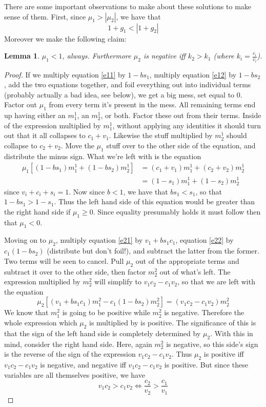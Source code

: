 \documentclass{article}
\theoremstyle{definition}
\theoremstyle{plain}
\theoremstyle{theorem}
\newtheorem{lemma}{Lemma}[section]
\begin{document}
There are some important observations to make about these solutions to make sense of them. First, since $\mu_1 > |\mu_2|$, we have that 
\[ 1+g_1 < |1+g_2| \]
Moreover we make the following claim:
\begin{lemma}
	$\mu_1 < 1$, always. Furthermore $\mu_2$ is negative iff $k_2 > k_1$ (where $k_i = \frac{c_i}{v_i}$). 
\end{lemma}
\begin{proof}
	If we multiply equation \ref{e11} by $1-bs_1$, multiply equation \ref{e12} by $1-bs_2$, add the two equations together, and foil everything out into individual terms (probably actually a bad idea, see below), we get a big mess, set equal to $0$. Factor out $\mu_1$ from every term it's present in the mess. All remaining terms end up having either an $m^1_1$, an $m^1_2$, or both. Factor these out from their terms. Inside of the expression multiplied by $m^1_1$, without applying any identities it should turn out that it all collapses to $c_1+v_1$. Likewise the stuff multiplied by $m^1_2$ should collapse to $c_2 + v_2$. Move the $\mu_1$ stuff over to the other side of the equation, and distribute the minus sign. What we're left with is the equation 
\begin{align}
	 \mu_1[(1-bs_1)m^1_1 + (1-bs_2)m^1_2] &= (c_1+v_1)m^1_1 + (c_2+v_2)m^1_2 \\
	 &= (1-s_1)m^1_1 + (1-s_2)m^1_2
\end{align}
since $v_i+c_i+s_i=1$. Now since $b<1$, we have that $bs_1 < s_1$, so that $1-bs_1 > 1-s_1$. Thus the left hand side of this equation would be greater than the right hand side if $\mu_1 \geq 0$. Since equality presumably holds it must follow then that $\mu_1 < 0$. \par 
Moving on to $\mu_2$, multiply equation \ref{e21} by $v_1 + bs_1c_1$, equation \ref{e22} by $c_1(1-bs_2)$ (distribute but don't foil!), and subtract the latter from the former. Two terms will be seen to cancel. Pull $\mu_2$ out of the appropriate terms and subtract it over to the other side, then factor $m^2_2$ out of what's left. The expression multiplied by $m^2_2$ will simplify to $v_1c_2 - c_1v_2$, so that we are left with the equation
\[ \mu_2[(v_1+bs_1c_1)m^2_1-c_1(1-bs_2)m^2_2] = (v_1c_2 - c_1v_2)m^2_2 \]
We know that $m^2_1$ is going to be positive while $m^2_2$ is negative. Therefore the whole expression which $\mu_2$ is multiplied by is positive. The significance of this is that the sign of the left hand side is completely determined by $\mu_2$. With this in mind, consider the right hand side. Here, again $m^2_2$ is negative, so this side's sign is the reverse of the sign of the expression $v_1c_2 - c_1v_2$. Thus $\mu_2$ is positive iff $v_1c_2 - c_1v_2$ is negative, and negative iff $v_1c_2 - c_1v_2$ is positive. But since these variables are all themselves positive, we have
\[ v_1c_2 > c_1v_2 \iff \frac{c_2}{v_2} > \frac{c_1}{v_1}  \]
\end{proof}
\end{document}
